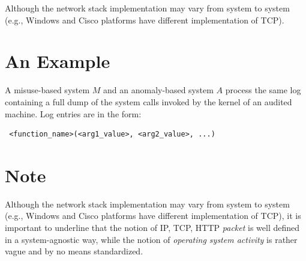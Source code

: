 \begin{rem}
Although the network stack implementation may vary from system to system (e.g., \textsf{Windows} and \textsf{Cisco} platforms have different implementation of \ac{TCP}).
\end{rem}


\section{An Example}

\begin{example}\label{ex:misuse-vs-anomaly}
A misuse-based system $M$ and an anomaly-based system $A$ process the same log containing a full dump of the system calls invoked by the kernel of an audited machine. Log entries are in the form:

\begin{center}\small
\begin{verbatim} <function_name>(<arg1_value>, <arg2_value>, ...)
\end{verbatim}
\end{center}
\end{example}


\section{Note}

\begin{note}\label{note:network-stack-standardized}
Although the network stack implementation may vary from system to system (e.g., \textsf{Windows} and \textsf{Cisco} platforms have different implementation of \ac{TCP}), it is important to underline that the notion of IP, TCP, HTTP \emph{packet} is well defined in a system-agnostic way, while the notion of \emph{operating system activity} is rather vague and by no means standardized.
\end{note}
